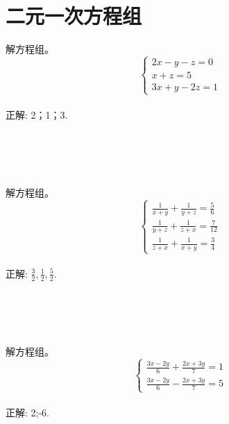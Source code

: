 \section{二元一次方程组}

\item {
    解方程组。
    \[\left\{
        \begin{array}{l}
            2x - y - z = 0 \\
            x + z = 5 \\
            3x + y - 2z = 1
        \end{array}
    \right.\]
    \ifshowSolution
        \fangsong{}
        \\
        正解: 2；1；3.
    \else
        \\ \\ \\ \\ \\
    \fi
}

\item {
    解方程组。
    \[\left\{
        \begin{array}{l}
            \frac{1}{x+y} + \frac{1}{y+z} = \frac{5}{6} \\
            \frac{1}{y+z} + \frac{1}{z+x} = \frac{7}{12} \\
            \frac{1}{z+x} + \frac{1}{x+y} = \frac{3}{4}
        \end{array}
    \right.\]
    \ifshowSolution
        \fangsong{}
        \\
        正解: $\frac32, \frac12, \frac52$.
    \else
        \\ \\ \\ \\ \\
    \fi
}

\item {
    解方程组。
    \[\left\{
        \begin{array}{l}
            \frac{3x-2y}{6} + \frac{2x+3y}{7} = 1 \\
            \frac{3x-2y}{6} - \frac{2x+3y}{7} = 5 
        \end{array}
    \right.\]
    \ifshowSolution
        \fangsong{}
        \\
        正解: 2;-6.
    \else
        \\ \\ \\ \\ \\
    \fi
}


